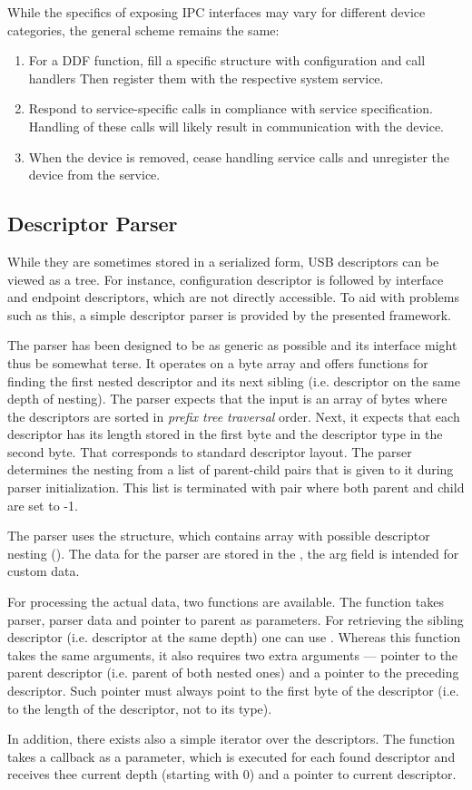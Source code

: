 While the specifics of exposing IPC interfaces may vary for different device
categories, the general scheme remains the same:
%
\begin{enumerate}
	\item For a DDF function, fill a specific structure with configuration and
		call handlers Then register them with the respective system service.
	\item Respond to service-specific calls in compliance with service
		specification. Handling of these calls will likely result in
		communication with the device.
	\item When the device is removed, cease handling service calls and
		unregister the device from the service.
\end{enumerate}


\subsection{Descriptor Parser}

While they are sometimes stored in a serialized form, USB descriptors can be
viewed as a tree. For instance, configuration descriptor is followed by
interface and endpoint descriptors, which are not directly accessible. To aid
with problems such as this, a simple descriptor parser is provided by the
presented framework.

The parser has been designed to be as generic as possible and its interface
might thus be somewhat terse. It operates on a byte array and offers functions
for finding the first nested descriptor and its next sibling (i.e. descriptor on
the same depth of nesting). The parser expects that the input is an array of
bytes where the descriptors are sorted in \textit{prefix tree traversal} order.
Next, it expects that each descriptor has its length stored in the first byte
and the descriptor type in the second byte. That corresponds to standard
descriptor layout. The parser determines the nesting from a list of parent-child
pairs that is given to it during parser initialization. This list is terminated
with pair where both parent and child are set to -1.

The parser uses the  structure, which contains array
with possible descriptor nesting (). The
data for the parser are stored in the , the arg
field is intended for custom data.

For processing the actual data, two functions are available. The
 function takes parser, parser data and
pointer to parent as parameters. For retrieving the sibling descriptor (i.e.
descriptor at the same depth) one can use .
Whereas this function takes the same arguments, it also requires two extra
arguments — pointer to the parent descriptor (i.e. parent of both nested ones)
and a pointer to the preceding descriptor. Such pointer must always point to
the first byte of the descriptor (i.e. to the length of the descriptor, not to
its type).

In addition, there exists also a simple iterator over the descriptors. The
function  takes a callback as a parameter, which is
executed for each found descriptor and receives thee current depth (starting
with 0) and a pointer to current descriptor.



